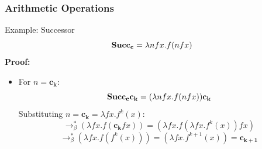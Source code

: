 \documentclass{beamer}
\begin{document}
\begin{frame}
  \frametitle{Arithmetic Operations}
  \begin{block}{Example: Successor}
    \[
    \text{\textbf{Succ}}_\mathbf{c} = \lambda nfx. f(nfx)
    \]
    \textbf{Proof:}
    \begin{itemize}
      \item For \(n = \mathbf{c_k}\):
      \[
      \text{\textbf{Succ}}_\mathbf{c} \mathbf{c_k} = (\lambda nfx. f(nfx)) \mathbf{c_k}
      \]
      Substituting \(n = \mathbf{c_k} = \lambda fx. f^k(x)\):
      \[
      \rightarrow_\beta^* (\lambda fx. f(\mathbf{c_k}fx)) = (\lambda fx. f(\lambda fx.f^k(x))fx)
      \]
      \[
      \rightarrow_\beta^* (\lambda fx. f(f^k(x))) = (\lambda fx.f^{k+1}(x)) = \mathbf{c_{k+1}}
      \]
    \end{itemize}
    
  \end{block}

  

\end{frame}
\end{document}
